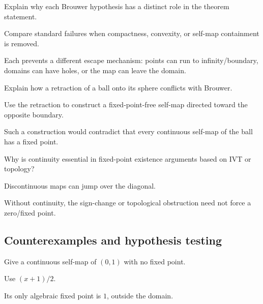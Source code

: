 \begin{exercise}\label{exr:ii17-expand-07}
Explain why each Brouwer hypothesis has a distinct role in the theorem statement.
\end{exercise}
\begin{hint}
Compare standard failures when compactness, convexity, or self-map containment is removed.
\end{hint}
\begin{solution}
Each prevents a different escape mechanism: points can run to infinity/boundary, domains can have holes, or the map can leave the domain.
\end{solution}

\begin{exercise}\label{exr:ii17-expand-08}
Explain how a retraction of a ball onto its sphere conflicts with Brouwer.
\end{exercise}
\begin{hint}
Use the retraction to construct a fixed-point-free self-map directed toward the opposite boundary.
\end{hint}
\begin{solution}
Such a construction would contradict that every continuous self-map of the ball has a fixed point.
\end{solution}

\begin{exercise}\label{exr:ii17-expand-09}
Why is continuity essential in fixed-point existence arguments based on IVT or topology?
\end{exercise}
\begin{hint}
Discontinuous maps can jump over the diagonal.
\end{hint}
\begin{solution}
Without continuity, the sign-change or topological obstruction need not force a zero/fixed point.
\end{solution}

\subsection*{Counterexamples and hypothesis testing}

\begin{exercise}\label{exr:ii17-expand-10}
Give a continuous self-map of \((0,1)\) with no fixed point.
\end{exercise}
\begin{hint}
Use \((x+1)/2\).
\end{hint}
\begin{solution}
Its only algebraic fixed point is \(1\), outside the domain.
\end{solution}

